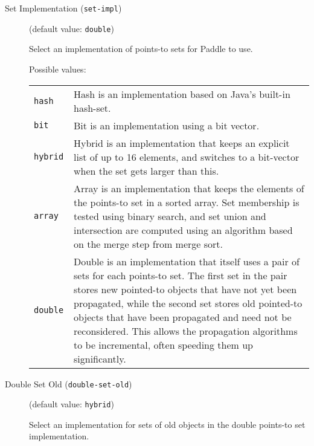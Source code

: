 \documentclass{article}
\begin{document}
\begin{description}
\begin{longtable}{p{1in}p{4in}}
\end{longtable}


\item[Set Implementation ({\tt set-impl})]
(default value: {\tt double})




Select an implementation of points-to sets for Paddle to use.




Possible values:\\
\begin{longtable}{p{1in}p{4in}}

{\tt hash }
&

Hash is an implementation based on Java's built-in hash-set.
\\

{\tt bit }
&

Bit is an implementation using a bit vector.
\\

{\tt hybrid }
&

Hybrid is an implementation that keeps an explicit list of up to
16 elements, and switches to a bit-vector when the set gets
larger than this.
\\

{\tt array }
&

Array is an implementation that keeps the elements of the
points-to set in a sorted array. Set membership is tested using
binary search, and set union and intersection are computed using
an algorithm based on the merge step from merge sort.
\\

{\tt double }
&

Double is an implementation that itself uses a pair of sets for
each points-to set. The first set in the pair stores new pointed-to
objects that have not yet been propagated, while the second set stores
old pointed-to objects that have been propagated and need not be
reconsidered. This allows the propagation algorithms to be incremental,
often speeding them up significantly.
\\

\end{longtable}


\item[Double Set Old ({\tt double-set-old})]
(default value: {\tt hybrid})




Select an implementation for sets of old objects in the double
points-to set implementation.


\end{description}
\end{document}
